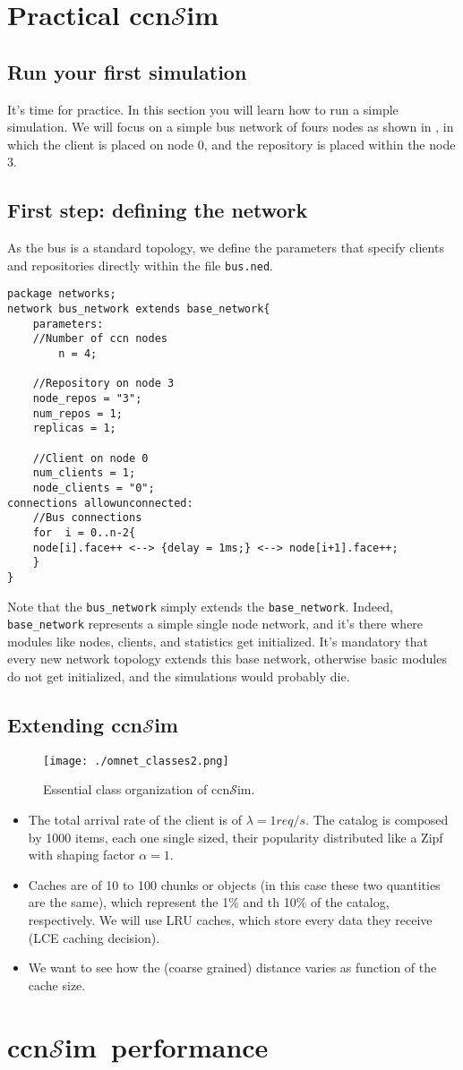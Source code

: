 \documentclass{book}
\newcommand{\ccnsim}{ccn$\mathcal{S}$im}
\begin{document}
\chapter{Practical \ccnsim}\label{ch:practice}
\section{Run your first simulation}
It's time for practice. In this section you will learn how to run a simple simulation. We will focus on a simple bus network of fours nodes as shown in , in which the client is placed on node 0, and the repository is placed within the node 3.
\section{First step: defining the network}
As the bus is a standard topology, we define the parameters that specify clients and repositories directly within the file \verb|bus.ned|. 
\begin{Verbatim}[frame=single]
package networks;
network bus_network extends base_network{
    parameters:
	//Number of ccn nodes
    	n = 4; 

	//Repository on node 3
	node_repos = "3";
	num_repos = 1;
	replicas = 1;

	//Client on node 0
	num_clients = 1;
	node_clients = "0";
connections allowunconnected:
    //Bus connections
    for  i = 0..n-2{
	node[i].face++ <--> {delay = 1ms;} <--> node[i+1].face++;
    }
}
\end{Verbatim}
Note that the \verb|bus_network| simply extends the \verb|base_network|. Indeed, \verb|base_network| represents a simple single node network, and it's there where modules like nodes, clients, and statistics get initialized. It's mandatory that every new network topology extends this base network, otherwise basic modules do not get initialized, and the simulations would probably die. 
\section{Extending \ccnsim}
\begin{figure}[h]
    \begin{center}
	\texttt{[image: ./omnet\_classes2.png]}
    \end{center}
    \caption{Essential class organization of \ccnsim.}
    \label{fig:class}
\end{figure}


\begin{itemize}
    \item The total arrival rate of the client is of $\lambda=1req/s$. The catalog is composed by 1000 items, each one single sized, their popularity distributed like a Zipf with shaping factor $\alpha=1$. 
    \item Caches are of 10 to 100 chunks or objects (in this case these two quantities are the same), which represent the 1\% and th 10\% of the catalog, respectively. We will use LRU caches, which store every data they receive (LCE caching decision). 
    \item We want to see how the (coarse grained) distance varies as function of the cache size. 
\end{itemize}
\chapter{\ccnsim\ performance}\label{ch:perf}


\end{document}
